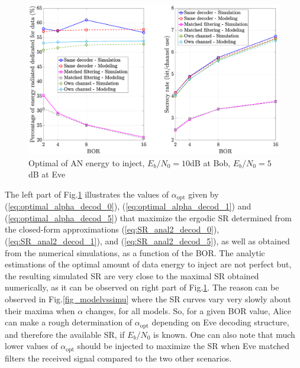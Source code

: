 \documentclass[journal,comsoc]{IEEEtran}
\let\MYoriglatexcaption\caption
\renewcommand{\caption}[2][\relax]{\MYoriglatexcaption[#2]{#2}}
\begin{document}
\begin{figure}[h!t]
	\centering
	\includegraphics[width=1.1\linewidth]{graphs/SISO_no_corr_optimal_alpha_EbN0b_10_EbN0e_5.eps}
	\caption{Optimal of AN energy to inject, $E_b/N_0 = 10$dB at Bob,  $E_b/N_0 = 5$dB at Eve}
	\label{fig_optimalAN}
\end{figure}
The left part of Fig.\ref{fig_optimalAN} illustrates the values of $\alpha_{\text{opt}}$ given by (\ref{eq:optimal_alpha_decod_0}), (\ref{eq:optimal_alpha_decod_1}) and (\ref{eq:optimal_alpha_decod_5}) that maximize the  ergodic SR determined from the closed-form approximations (\ref{eq:SR_anal2_decod_0}), (\ref{eq:SR_anal2_decod_1}), and (\ref{eq:SR_anal2_decod_5}), as well as obtained from the numerical simulations, as a function of the BOR. The analytic estimations of the optimal amount of data energy to inject are not perfect but, the resulting simulated SR are very close to the maximal SR obtained numerically, as it can be observed on right part of Fig.\ref{fig_optimalAN}. The reason can be observed in Fig.\ref{fig_modelvssimu} where the SR curves vary very slowly about their maxima when $\alpha$ changes, for all models. So, for a given BOR value, Alice can make a rough determination of $\alpha_{\text{opt}}$ depending on Eve decoding structure, and therefore the available SR, if $E_b/N_0$ is known. One can also note that much lower values of $\alpha_{\text{opt}}$ should be injected to maximize the SR when Eve matched filters the received signal compared to the two other scenarios.
\end{document}

